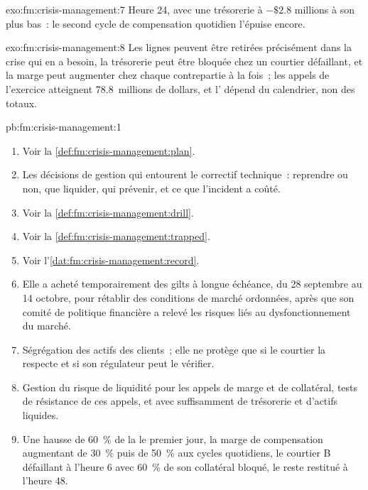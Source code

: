\begin{solution}{exo:fm:crisis-management:7}
Heure 24, avec une trésorerie à $-\$2.8$ millions à son plus bas~: le second cycle de compensation quotidien l'épuise encore.
\end{solution}

\begin{solution}{exo:fm:crisis-management:8}
Les lignes peuvent être retirées précisément dans la crise qui en a besoin, la trésorerie peut être bloquée chez un courtier défaillant, et la marge peut augmenter chez chaque contrepartie à
la fois~; les appels de l'exercice atteignent 78.8~millions de dollars, et l' dépend du calendrier, non des totaux.
\end{solution}

\begin{solution}{pb:fm:crisis-management:1}
\begin{enumerate}
\item Voir la \cref{def:fm:crisis-management:plan}.
\item Les décisions de gestion qui entourent le correctif technique~: reprendre ou non, que liquider, qui prévenir, et ce que l'incident a coûté.
\item Voir la \cref{def:fm:crisis-management:drill}.
\item Voir la \cref{def:fm:crisis-management:trapped}.
\item Voir l'\cref{dat:fm:crisis-management:record}.
\item Elle a acheté temporairement des gilts à longue échéance, du 28 septembre au 14 octobre, pour rétablir des conditions de marché ordonnées, après que son comité de politique financière
a relevé les risques liés au dysfonctionnement du marché.
\item Ségrégation des actifs des clients~; elle ne protège que si le courtier la respecte et si son régulateur peut le vérifier.
\item Gestion du risque de liquidité pour les appels de marge et de collatéral, tests de résistance de ces appels, et  avec suffisamment de trésorerie et d'actifs liquides.
\item Une hausse de 60~\% de la  le premier jour, la marge de compensation augmentant de 30~\% puis de 50~\% aux cycles quotidiens, le courtier B défaillant à l'heure 6 avec 60~\%
de son collatéral bloqué, le reste restitué à l'heure 48.

\end{enumerate}
\end{solution}
